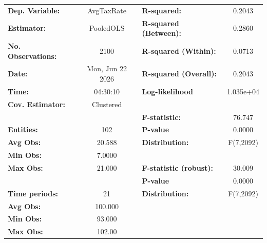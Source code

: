 \begin{center}
\begin{tabular}{lclc}
\toprule
\textbf{Dep. Variable:}                       &     AvgTaxRate     & \textbf{  R-squared:         }   &      0.2043      \\
\textbf{Estimator:}                           &     PooledOLS      & \textbf{  R-squared (Between):}  &      0.2860      \\
\textbf{No. Observations:}                    &        2100        & \textbf{  R-squared (Within):}   &      0.0713      \\
\textbf{Date:}                                &  Mon, Jun 22 2026  & \textbf{  R-squared (Overall):}  &      0.2043      \\
\textbf{Time:}                                &      04:30:10      & \textbf{  Log-likelihood     }   &    1.035e+04     \\
\textbf{Cov. Estimator:}                      &     Clustered      & \textbf{                     }   &                  \\
\textbf{}                                     &                    & \textbf{  F-statistic:       }   &      76.747      \\
\textbf{Entities:}                            &        102         & \textbf{  P-value            }   &      0.0000      \\
\textbf{Avg Obs:}                             &       20.588       & \textbf{  Distribution:      }   &    F(7,2092)     \\
\textbf{Min Obs:}                             &       7.0000       & \textbf{                     }   &                  \\
\textbf{Max Obs:}                             &       21.000       & \textbf{  F-statistic (robust):} &      30.009      \\
\textbf{}                                     &                    & \textbf{  P-value            }   &      0.0000      \\
\textbf{Time periods:}                        &         21         & \textbf{  Distribution:      }   &    F(7,2092)     \\
\textbf{Avg Obs:}                             &      100.000       & \textbf{                     }   &                  \\
\textbf{Min Obs:}                             &       93.000       & \textbf{                     }   &                  \\
\textbf{Max Obs:}                             &       102.00       & \textbf{                     }   &                  \\

\end{tabular}
\end{center}
